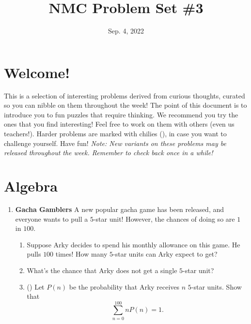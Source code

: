 \documentclass[11pt]{scrartcl}
\begin{document}
\title{NMC Problem Set \#3}
\date{Sep. 4, 2022} 
\maketitle

\section*{Welcome!}

This is a selection of interesting problems derived from curious thoughts, curated so you can nibble on them throughout the week! The point of this document is to introduce you to fun puzzles that require thinking. We recommend you try the ones that you find interesting! Feel free to work on them with others (even us teachers!). Harder problems are marked with chilies (\fullchili), in case you want to challenge yourself.
\newline\newline
Have fun! \textit{Note: New variants on these problems may be released throughout the week. Remember to check back once in a while!}
    
\section{Algebra}
\begin{enumerate}[label=\textbf{A\arabic*}.]
    \item \textbf{Gacha Gamblers} \newline
    A new popular gacha game has been released, and everyone wants to pull a $5$-star unit! However, the chances of doing so are $1$ in $100$.
    \begin{enumerate}
        \item Suppose Arky decides to spend his monthly allowance on this game. He pulls $100$ times! How many $5$-star units can Arky expect to get?
        \item What's the chance that Arky does not get a single $5$-star unit?
        \item (\fullchili) Let $P(n)$ be the probability that Arky receives $n$ $5$-star units. Show that
        \[ \sum_{n = 0}^{100}nP(n) = 1. \]
    \end{enumerate}
\end{enumerate}

\newpage
\end{document}
